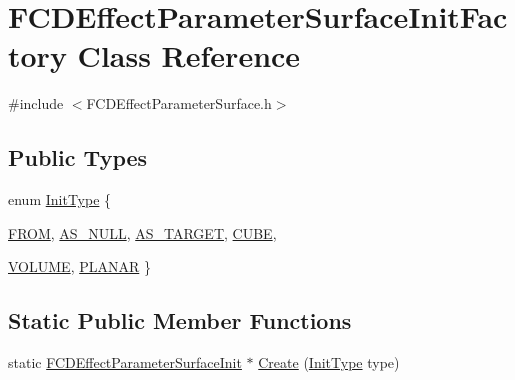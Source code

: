 \hypertarget{classFCDEffectParameterSurfaceInitFactory}{
\section{FCDEffectParameterSurfaceInitFactory Class Reference}
\label{classFCDEffectParameterSurfaceInitFactory}
}


{\ttfamily \#include $<$FCDEffectParameterSurface.h$>$}

\subsection*{Public Types}
\begin{DoxyCompactItemize}
\item 
enum \hyperlink{classFCDEffectParameterSurfaceInitFactory_a65e74f1159865702cac5236dd5d83892}{InitType} \{ \par
\hyperlink{classFCDEffectParameterSurfaceInitFactory_a65e74f1159865702cac5236dd5d83892aa87c1f6872f211a3f525c11557149e4d}{FROM}, 
\hyperlink{classFCDEffectParameterSurfaceInitFactory_a65e74f1159865702cac5236dd5d83892a90f0b3c1c0dfe447ea2f973141eb0b1c}{AS\_\-NULL}, 
\hyperlink{classFCDEffectParameterSurfaceInitFactory_a65e74f1159865702cac5236dd5d83892ad1baa0ff12391ddc3dd1f9c40ea77906}{AS\_\-TARGET}, 
\hyperlink{classFCDEffectParameterSurfaceInitFactory_a65e74f1159865702cac5236dd5d83892ae2d69f0436ba18d343605f554e30ed22}{CUBE}, 
\par
\hyperlink{classFCDEffectParameterSurfaceInitFactory_a65e74f1159865702cac5236dd5d83892a328076a8538f429eb5988879c0e643cd}{VOLUME}, 
\hyperlink{classFCDEffectParameterSurfaceInitFactory_a65e74f1159865702cac5236dd5d83892a5c8434819c6046c14dff8f793841ac51}{PLANAR}
 \}
\end{DoxyCompactItemize}
\subsection*{Static Public Member Functions}
\begin{DoxyCompactItemize}
\item 
static \hyperlink{classFCDEffectParameterSurfaceInit}{FCDEffectParameterSurfaceInit} $\ast$ \hyperlink{classFCDEffectParameterSurfaceInitFactory_aaebd11b1bbf4ac88b544c8917bf4c979}{Create} (\hyperlink{classFCDEffectParameterSurfaceInitFactory_a65e74f1159865702cac5236dd5d83892}{InitType} type)
\end{DoxyCompactItemize}


